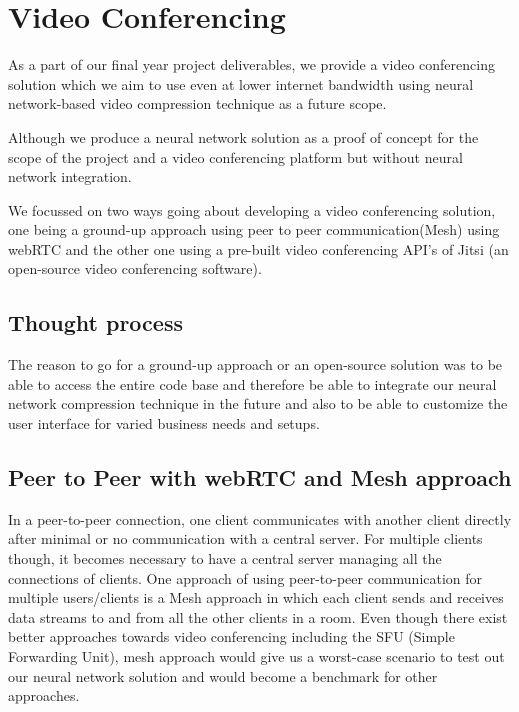 \section{Video Conferencing}
As a part of our final year project deliverables, we provide a video conferencing solution which we aim to use even 
at lower internet bandwidth using neural network-based video compression technique as a future scope.


Although we produce a neural network solution as a proof of concept for the scope of the project and a video 
conferencing platform but without neural network integration.

We focussed on two ways going about developing a video conferencing solution, one being a ground-up approach using peer 
to peer communication(Mesh) using webRTC and the other one using a pre-built video conferencing API’s of Jitsi 
(an open-source video conferencing software).


\subsection{Thought process}

The reason to go for a ground-up approach or an open-source solution was to be able to access the entire code 
base and therefore be able to integrate our neural network compression technique in the future and also to be able to
customize the user interface for varied business needs and setups.

\subsection{ Peer to Peer with webRTC and Mesh approach}
In a peer-to-peer connection, one client communicates with another client directly after minimal or no communication with a central server.
For multiple clients though, it becomes necessary to have a central server managing all the connections of clients.
One approach of using peer-to-peer communication for multiple users/clients is a Mesh approach in which each client sends and receives data streams to and from all the other clients in a room.
Even though there exist better approaches towards video conferencing including the SFU (Simple Forwarding Unit), 
mesh approach would give us a worst-case scenario to test out our neural network solution and would become a benchmark for other approaches.

